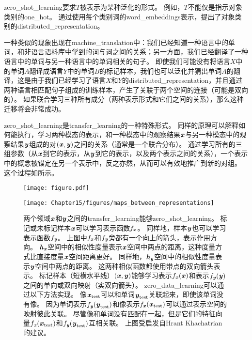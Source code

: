 
\gls{zero_shot_learning}要求$T$被表示为某种泛化的形式。
例如，$T$不能仅是指示对象类别的\gls{one_hot}。
通过使用每个类别词的\gls{word_embeddings}表示，\cite{Socher-2013}提出了对象类别的\gls{distributed_representation}。


一种类似的现象出现在\gls{machine_translation}中\citep{Klementiev-et-al-COLING2012,Mikolov-et-al-arxiv2013,Gouws-et-al-arxiv2014}：我们已经知道一种语言中的单词，和非语言语料库中学到的词与词之间的关系；另一方面，我们已经翻译了一种语言中的单词与另一种语言中的单词相关的句子。
即使我们可能没有将语言$X$中的单词$A$翻译成语言$Y$中的单词$B$的标记样本，我们也可以泛化并猜出单词$A$的翻译，这是由于我们已经学习了语言$X$和$Y$的\gls{distributed_representation}，并且通过两种语言相匹配句子组成的训练样本，产生了关联于两个空间的连接（可能是双向的）。
如果联合学习三种所有成分（两种表示形式和它们之间的关系），那么这种迁移将会非常成功。


\gls{zero_shot_learning}是\gls{transfer_learning}的一种特殊形式。
同样的原理可以解释如何能执行，学习两种模态的表示，和一种模态中的观察结果$\boldsymbol{\mathit{x}}$与另一种模态中的观察结果$\boldsymbol{\mathit{y}}$组成的对$(\boldsymbol{\mathit{x}}, \boldsymbol{\mathit{y}})$之间的关系（通常是一个联合分布）\citep{Srivastava+Salakhutdinov-NIPS2012-small}。
通过学习所有的三组参数（从$\boldsymbol{\mathit{x}}$到它的表示，从$\boldsymbol{\mathit{y}}$到它的表示，以及两个表示之间的关系），一个表示中的概念被锚定在另一个表示中，反之亦然，从而可以有效地推广到新的对组。
这个过程如所示。

\begin{figure}[!htb]
\ifOpenSource
\centerline{\texttt{[image: figure.pdf]}}
\else
\centerline{\texttt{[image: Chapter15/figures/maps\_between\_representations]}}
\fi
\caption{两个领域$\boldsymbol{\mathit{x}}$和$\boldsymbol{\mathit{y}}$之间的\gls{transfer_learning}能够\gls{zero_shot_learning}。
标记或未标记样本$\boldsymbol{\mathit{x}}$可以学习表示函数$f_{\boldsymbol{\mathit{x}}}$。
同样地，样本$\boldsymbol{\mathit{y}}$也可以学习表示函数$f_{\boldsymbol{\mathit{y}}}$。
上图中$f_{\boldsymbol{\mathit{x}}}$和$f_{\boldsymbol{\mathit{y}}}$旁都有一个向上的箭头，表示作用方向。
$\boldsymbol{\mathit{h}}_{\boldsymbol{\mathit{x}}}$空间中的相似性度量表示$\boldsymbol{\mathit{x}}$空间中两点的距离，这种度量方式比直接度量$\boldsymbol{\mathit{x}}$空间距离更好。
同样地，$\boldsymbol{\mathit{h}}_{\boldsymbol{\mathit{y}}}$空间中的相似性度量表示$\boldsymbol{\mathit{y}}$空间中两点的距离。
这两种相似函数都使用带点的双向箭头表示。
标记样本（短横水平线）$(\boldsymbol{\mathit{x}}, \boldsymbol{\mathit{y}})$能够学习表示$f_{\boldsymbol{\mathit{x}}}(\boldsymbol{\mathit{x}})$和表示$f_{\boldsymbol{\mathit{y}}}(\boldsymbol{\mathit{y}})$之间的单向或双向映射（实双向箭头）。
\gls{zero_data_learning}可以通过以下方法实现。
像$\boldsymbol{\mathit{x}}_{\text{test}}$可以和单词$\boldsymbol{\mathit{y}}_{\text{test}}$关联起来，即使该单词没有像。
因为单词表示$f_{\boldsymbol{\mathit{y}}}(\boldsymbol{\mathit{y}}_{\text{test}})$和像表示$f_{\boldsymbol{\mathit{x}}}(\boldsymbol{\mathit{x}}_{\text{test}})$可以通过表示空间的映射彼此关联。
尽管像和单词没有匹配在一起，但是它们的特征向量$f_{\boldsymbol{\mathit{x}}}(\boldsymbol{\mathit{x}}_{\text{test}})$和$f_{\boldsymbol{\mathit{y}}}(\boldsymbol{\mathit{y}}_{\text{test}})$互相关联。
上图受启发自Hrant Khachatrian的建议。
}
\label{fig:chap15_maps_between_representations}
\end{figure}

